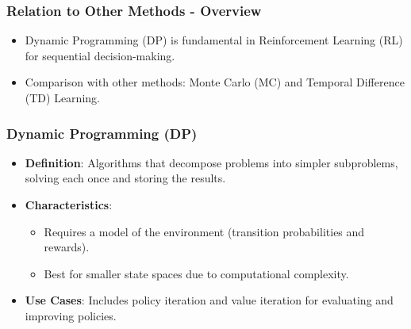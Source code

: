 \documentclass[aspectratio=169]{beamer}
\begin{document}
\begin{frame}[fragile]
    \frametitle{Relation to Other Methods - Overview}
    \begin{itemize}
        \item Dynamic Programming (DP) is fundamental in Reinforcement Learning (RL) for sequential decision-making.
        \item Comparison with other methods: Monte Carlo (MC) and Temporal Difference (TD) Learning.
    \end{itemize}
\end{frame}

\begin{frame}[fragile]
    \frametitle{Dynamic Programming (DP)}
    \begin{itemize}
        \item \textbf{Definition}: Algorithms that decompose problems into simpler subproblems, solving each once and storing the results.
        \item \textbf{Characteristics}:
        \begin{itemize}
            \item Requires a model of the environment (transition probabilities and rewards).
            \item Best for smaller state spaces due to computational complexity.
        \end{itemize}
        \item \textbf{Use Cases}: Includes policy iteration and value iteration for evaluating and improving policies.
    \end{itemize}
\end{frame}
\end{document}
